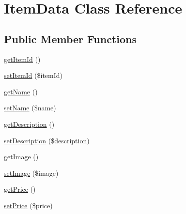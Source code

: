 \hypertarget{class_item_data}{\section{Item\+Data Class Reference}
\label{class_item_data}
}
\subsection*{Public Member Functions}
\begin{DoxyCompactItemize}
\item 
\hyperlink{class_item_data_a5b01110117f0cd71a5a115dc8b9eab6f}{get\+Item\+Id} ()
\item 
\hyperlink{class_item_data_a22de7a673c95892b16b497788139add1}{set\+Item\+Id} (\$item\+Id)
\item 
\hyperlink{class_item_data_a3d0963e68bb313b163a73f2803c64600}{get\+Name} ()
\item 
\hyperlink{class_item_data_a2fe666694997d047711d7653eca2f132}{set\+Name} (\$name)
\item 
\hyperlink{class_item_data_a2e7bb35c71bf1824456ceb944cb7a845}{get\+Description} ()
\item 
\hyperlink{class_item_data_a31fad3e39336ea079ea758e051866627}{set\+Description} (\$description)
\item 
\hyperlink{class_item_data_a2af8add37797384585cae101fb8cbfe7}{get\+Image} ()
\item 
\hyperlink{class_item_data_af785d0fb8da1ba24ec74c2f9f7e27c0a}{set\+Image} (\$image)
\item 
\hyperlink{class_item_data_a38146d2beb1dd6dfd0f2a5886e18a538}{get\+Price} ()
\item 
\hyperlink{class_item_data_a2e232712bdbc759793fab2cf08506c25}{set\+Price} (\$price)
\end{DoxyCompactItemize}
